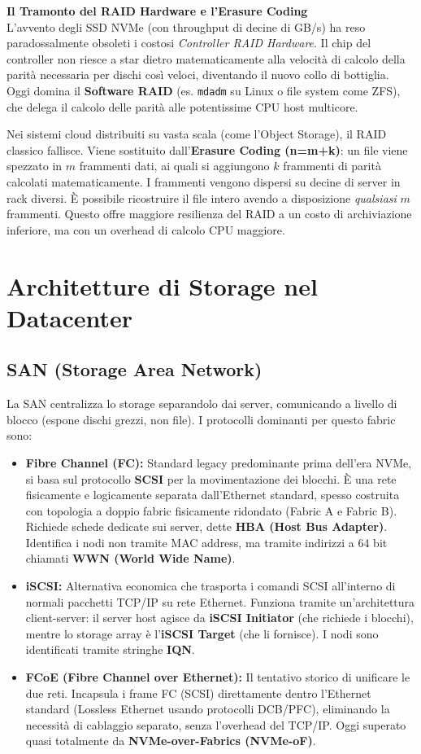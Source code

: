 \textbf{Il Tramonto del RAID Hardware e l'Erasure Coding}\\
L'avvento degli SSD NVMe (con throughput di decine di GB/s) ha reso paradossalmente obsoleti i costosi \textit{Controller RAID Hardware}. Il chip del controller non riesce a star dietro matematicamente alla velocità di calcolo della parità necessaria per dischi così veloci, diventando il nuovo collo di bottiglia. Oggi domina il \textbf{Software RAID} (es. \texttt{mdadm} su Linux o file system come ZFS), che delega il calcolo delle parità alle potentissime CPU host multicore.

Nei sistemi cloud distribuiti su vasta scala (come l'Object Storage), il RAID classico fallisce. Viene sostituito dall'\textbf{Erasure Coding (n=m+k)}: un file viene spezzato in $m$ frammenti dati, ai quali si aggiungono $k$ frammenti di parità calcolati matematicamente. I frammenti vengono dispersi su decine di server in rack diversi. È possibile ricostruire il file intero avendo a disposizione \textit{qualsiasi} $m$ frammenti. Questo offre maggiore resilienza del RAID a un costo di archiviazione inferiore, ma con un overhead di calcolo CPU maggiore.

\section{Architetture di Storage nel Datacenter}

\subsection{SAN (Storage Area Network)}
La SAN centralizza lo storage separandolo dai server, comunicando a livello di blocco (espone dischi grezzi, non file). I protocolli dominanti per questo fabric sono:
\begin{itemize}
    \item \textbf{Fibre Channel (FC):} Standard legacy predominante prima dell'era NVMe, si basa sul protocollo \textbf{SCSI} per la movimentazione dei blocchi. È una rete fisicamente e logicamente separata dall'Ethernet standard, spesso costruita con topologia a doppio fabric fisicamente ridondato (Fabric A e Fabric B). Richiede schede dedicate sui server, dette \textbf{HBA (Host Bus Adapter)}. Identifica i nodi non tramite MAC address, ma tramite indirizzi a 64 bit chiamati \textbf{WWN (World Wide Name)}.
    \item \textbf{iSCSI:} Alternativa economica che trasporta i comandi SCSI all'interno di normali pacchetti TCP/IP su rete Ethernet. Funziona tramite un'architettura client-server: il server host agisce da \textbf{iSCSI Initiator} (che richiede i blocchi), mentre lo storage array è l'\textbf{iSCSI Target} (che li fornisce). I nodi sono identificati tramite stringhe \textbf{IQN}.
    \item \textbf{FCoE (Fibre Channel over Ethernet):} Il tentativo storico di unificare le due reti. Incapsula i frame FC (SCSI) direttamente dentro l'Ethernet standard (Lossless Ethernet usando protocolli DCB/PFC), eliminando la necessità di cablaggio separato, senza l'overhead del TCP/IP. Oggi superato quasi totalmente da \textbf{NVMe-over-Fabrics (NVMe-oF)}.
\end{itemize}

